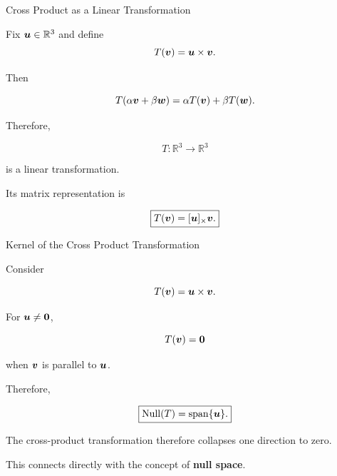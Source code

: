 \begin{frame}{Cross Product as a Linear Transformation}

Fix $\bm{u}\in\mathbb{R}^3$ and define
\vspace{-0.1cm}
\[
T(\bm{v})
=
\bm{u}\times\bm{v}.
\]

Then

\[
T(\alpha\bm{v}+\beta\bm{w})
=
\alpha T(\bm{v})
+
\beta T(\bm{w}).
\]

Therefore,

\[
\boxed{
T:\mathbb{R}^3\rightarrow\mathbb{R}^3
}
\]

is a linear transformation.

\vspace{0.4cm}

Its matrix representation is

\[
\boxed{
T(\bm{v})
=
[\bm{u}]_{\times}\bm{v}.
}
\]

\end{frame}



\begin{frame}{Kernel of the Cross Product Transformation}

Consider

\[
T(\bm{v})
=
\bm{u}\times\bm{v}.
\]

For $\bm{u}\neq\mathbf{0}$,

\[
T(\bm{v})=\mathbf{0}
\]

when $\bm{v}$ is parallel to $\bm{u}$.

Therefore,

\[
\boxed{
\operatorname{Null}(T)
=
\operatorname{span}\{\bm{u}\}.
}
\]

\vspace{0.4cm}

The cross-product transformation therefore collapses
one direction to zero.

This connects directly with the concept of
\textbf{null space}.

\end{frame}



